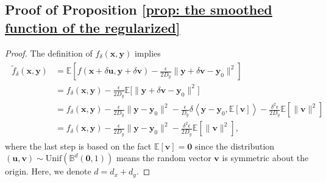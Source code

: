 \documentclass[11pt]{article}
\def\vzero{\mathbf{0}}
\def\vu{\mathbf{u}}
\def\vv{\mathbf{v}}
\def\vx{\mathbf{x}}
\def\vy{\mathbf{y}}
\def\BE{{\mathbb{E}}}
\begin{document}
\subsection{Proof of Proposition \ref{prop: the smoothed function of the regularized}}
\begin{proof}
The definition of $f_\delta(\vx,\vy)$ implies
\begin{align}\label{eq: compute the smoothed function of the regularized}
\begin{split}
\tilde f_\delta(\vx,\vy) 
& =  \BE\left[f(\vx+\delta\vu, \vy+\delta\vv)-\frac{\epsilon}{2D_y}\|\vy + \delta\vv -\vy_0\|^2\right] \\    
& = f_\delta(\vx,\vy)
-\frac{\epsilon}{2D_y}\mathbb{E}\big[\|\vy+\delta \vv-\vy_0\|^2\big]\\
& = f_\delta(\vx,\vy) - \frac{\epsilon}{2D_y}\|\vy-\vy_0\|^2
- \frac{\epsilon}{D_y}\delta \left\langle \vy-\vy_0,\mathbb{E}[\vv]\right\rangle - \frac{\delta^2\epsilon}{2D_y}\mathbb{E}\left[\|\vv\|^2\right] \\
&= f_\delta(\vx,\vy)-
\frac{\epsilon}{2D_y}\|\vy-\vy_0\|^2 - \frac{\delta^2\epsilon}{2D_y}\mathbb{E}\left[\|\vv\|^2\right],
    \end{split}
\end{align}
where the last step is based on the fact $\mathbb{E}[\vv]=\mathbf{0}$ since the distribution
$(\vu,\vv)\sim \mathrm{Unif}(\mathbb{B}^d(\vzero,1))$
means the random vector $\vv$ is symmetric about the origin. 
Here, we denote $d=d_x+d_y$.


\end{proof}
\end{document}
